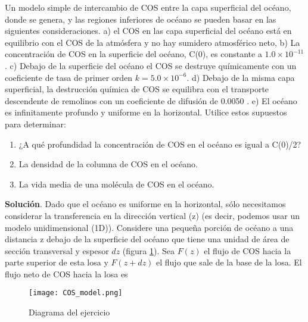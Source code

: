 \begin{example} Un modelo simple de intercambio de COS entre la capa superficial del océano, donde se genera, y las regiones inferiores de océano se pueden basar en las siguientes consideraciones. a) el COS en las capa superficial del océano está en equilibrio con el COS de la atmósfera y no hay sumidero atmosférico neto, b) La concentración de COS en la superficie del océano, C(0), es constante a $1.0\times10^{-11}$\kilogrampercubicmetre. c) Debajo de la superficie del océano el COS se destruye químicamente con  un coeficiente de tasa de primer orden $k=5.0\times10^{-6}$\per\second. d)  Debajo de la misma capa superficial, la destrucción química de COS se equilibra con el transporte descendente de remolinos con un coeficiente de difusión de 0.0050 \metre\per\square\second. e) El océano es infinitamente profundo y uniforme en la horizontal. Utilice estos supuestos para determinar:
\begin{enumerate}
\item ¿A qué profundidad la concentración de COS en el océano es igual a C(0)/2?
 \item  La densidad de la columna de COS en el océano.
 \item La vida media de una molécula de COS en el océano.
 \end{enumerate}
 
\textbf{Solución}. Dado que el océano es uniforme en la horizontal, sólo necesitamos considerar la transferencia en la dirección vertical (z) (es decir, podemos usar un modelo unidimensional (1D)). Considere una pequeña porción de océano a una distancia z debajo de la superficie del océano que tiene una unidad de área de sección transversal y espesor $dz$ (figura \ref{COS_fig}). Sea $F(z)$ el flujo de COS hacia la parte superior de esta losa y $F(z + dz)$ el flujo que sale de la base de la losa. El flujo neto de COS hacia la losa es
 
 \begin{figure}[hbtp]
\begin{center}
\texttt{[image: COS\_model.png]}
\caption{Diagrama del ejercicio}
\label{COS_fig}
\end{center}
\end{figure}


\end{example}
